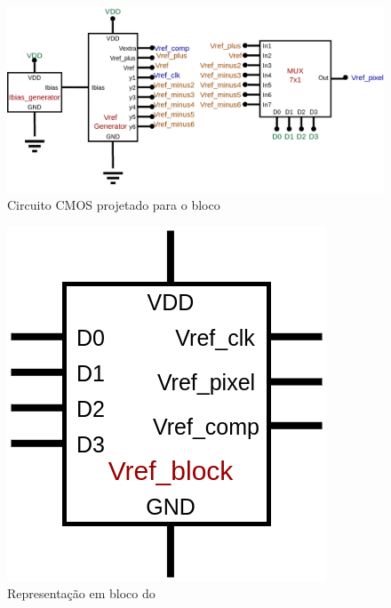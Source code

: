 \begin{figure}[htb]
 \centering
    \centering
    \caption{\label{\NomePFig}Circuito CMOS projetado para o bloco \NomeBloco}
    \includegraphics[scale=0.3]{Circuitos/vref_block.png}
\end{figure}

\begin{figure}[htb]
 \centering
    \centering
    \caption{\label{\NomeSFig}Representação em bloco do \NomeBloco}
    \includegraphics[scale=0.3]{Circuitos/vref_block_block.png}
\end{figure}